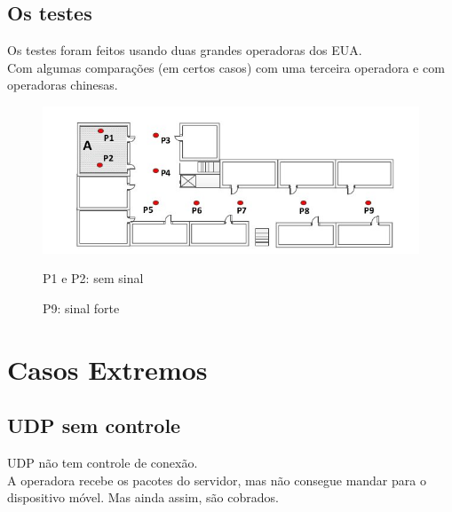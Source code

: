 \documentclass[brazil]{beamer}
\begin{document}
\subsection{Os testes}
\begin{frame}[fragile]
    Os testes foram feitos usando duas grandes operadoras dos EUA. \\
    \vspace{0.4cm}
    Com algumas comparações (em certos casos) com uma terceira operadora e com operadoras chinesas.
\end{frame}

\begin{frame}
    \begin{figure}
    \begin{center}
        \includegraphics[scale=0.3]{images/sala.jpg}
    \end{center}
    P1 e P2: sem sinal

    P9: sinal forte
    \end{figure}
\end{frame}

\section{Casos Extremos}

\subsection{UDP sem controle}

\begin{frame}[fragile]
    UDP não tem controle de conexão. \\
    A operadora recebe os pacotes do servidor, mas não consegue mandar para o dispositivo móvel. Mas ainda assim, são cobrados.
\end{frame}
\end{document}
